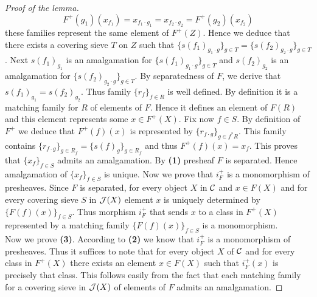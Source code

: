 \begin{proof}[Proof of the lemma]
$$F^+(g_1)(x_{f_1})=x_{f_1\cdot g_1}=x_{f_2\cdot g_2}=F^+(g_2)(x_{f_2})$$
these families represent the same element of $F^+(Z)$. Hence we deduce that there exists a covering sieve $T$ on $Z$ such that $\{s(f_1)_{g_1\cdot g}\}_{g\in T}=\{s(f_2)_{g_2\cdot g}\}_{g\in T}$. Next $s(f_1)_{g_1}$ is an amalgamation for $\{s(f_1)_{g_1\cdot g}\}_{g\in T}$ and $s(f_2)_{g_2}$ is an amalgamation for $\{s(f_2)_{g_2\cdot g}\}_{g\in T}$. By separatedness of $F$, we derive that $s(f_1)_{g_1}=s(f_2)_{g_2}$. Thus family $\{r_f\}_{f\in R}$ is well defined. By definition it is a matching family for $R$ of elements of $F$. Hence it defines an element of $F(R)$ and this element represents some $x\in F^+(X)$. Fix now $f\in S$. By definition of $F^+$ we deduce that $F^+(f)(x)$ is represented by $\{r_{f\cdot g}\}_{g\in f^*R}$. This family contains $\{r_{f\cdot g}\}_{g\in R_f}=\{s(f)_{g}\}_{g\in R_f}$ and thus $F^+(f)(x)=x_f$. This proves that $\{x_f\}_{f\in S}$ admits an amalgamation. By \textbf{(1)} presheaf $F$ is separated. Hence amalgamation of $\{x_f\}_{f\in S}$ is unique. Now we prove that $i^+_F$ is a monomorphism of presheaves. Since $F$ is separated, for every object $X$ in ${\mathcal C}$ and $x\in F(X)$ and for every covering sieve $S$ in ${\mathcal J}(X)$ element $x$ is uniquely determined by $\{F(f)(x)\}_{f\in S}$. Thus morphism $i^+_F$ that sends $x$ to a class in $F^+(X)$ represented by a matching family $\{F(f)(x)\}_{f\in S}$ is a monomorphism.\\
Now we prove \textbf{(3)}. According to \textbf{(2)} we know that $i^+_F$ is a monomorphism of presheaves. Thus it suffices to note that for every object $X$ of ${\mathcal C}$ and for every class in $F^+(X)$ there exists an element $x\in F(X)$ such that $i^+_F(x)$ is precisely that class. This follows easily from the fact that each matching family for a covering sieve in ${\mathcal J}(X)$ of elements of $F$ admits an amalgamation.
\end{proof}

